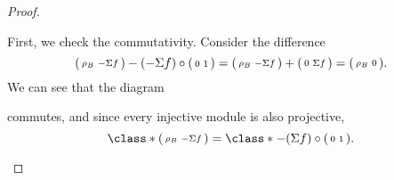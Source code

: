 \begin{proof}
\begin{enumerate}[label={(\bfseries TR\arabic*)}]
{            First, we check the commutativity. Consider the difference
            \[
                \begin{psmallmatrix}
                    \rho_B & -\Sigma f
                \end{psmallmatrix}
                -
                (-\Sigma f) \circ
                \begin{psmallmatrix}
                    0 & 1
                \end{psmallmatrix}
                =
                \begin{psmallmatrix}
                    \rho_B & -\Sigma f
                \end{psmallmatrix}
                +
                \begin{psmallmatrix}
                    0 & \Sigma f
                \end{psmallmatrix}
                =
                \begin{psmallmatrix}
                    \rho_B & 0
                \end{psmallmatrix}.
            \]
            We can see that the diagram
            \begin{center}
            \end{center}
            commutes, and since every injective module is also projective,
            \[
                \class*{
                    \begin{psmallmatrix}
                        \rho_B & -\Sigma f
                    \end{psmallmatrix}
                }
                =
                \class*{
                    -(\Sigma f) \circ
                    \begin{psmallmatrix}
                        0 & 1
                    \end{psmallmatrix}
                }.
            \]

}
\end{enumerate}
\end{proof}
